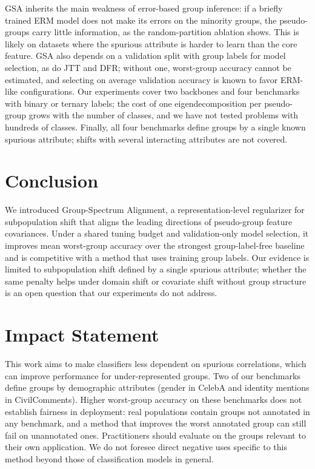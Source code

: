 \documentclass{article}
\begin{document}
GSA inherits the main weakness of error-based group inference: if a briefly trained ERM model does not make its errors on the minority groups, the pseudo-groups carry little information, as the random-partition ablation shows. This is likely on datasets where the spurious attribute is harder to learn than the core feature. GSA also depends on a validation split with group labels for model selection, as do JTT and DFR; without one, worst-group accuracy cannot be estimated, and selecting on average validation accuracy is known to favor ERM-like configurations. Our experiments cover two backbones and four benchmarks with binary or ternary labels; the cost of one eigendecomposition per pseudo-group grows with the number of classes, and we have not tested problems with hundreds of classes. Finally, all four benchmarks define groups by a single known spurious attribute; shifts with several interacting attributes are not covered.

\section{Conclusion}
\label{sec:conclusion}

We introduced Group-Spectrum Alignment, a representation-level regularizer for subpopulation shift that aligns the leading directions of pseudo-group feature covariances. Under a shared tuning budget and validation-only model selection, it improves mean worst-group accuracy over the strongest group-label-free baseline and is competitive with a method that uses training group labels. Our evidence is limited to subpopulation shift defined by a single spurious attribute; whether the same penalty helps under domain shift or covariate shift without group structure is an open question that our experiments do not address.

\section*{Impact Statement}

This work aims to make classifiers less dependent on spurious correlations, which can improve performance for under-represented groups. Two of our benchmarks define groups by demographic attributes (gender in CelebA and identity mentions in CivilComments). Higher worst-group accuracy on these benchmarks does not establish fairness in deployment: real populations contain groups not annotated in any benchmark, and a method that improves the worst annotated group can still fail on unannotated ones. Practitioners should evaluate on the groups relevant to their own application. We do not foresee direct negative uses specific to this method beyond those of classification models in general.
\end{document}
